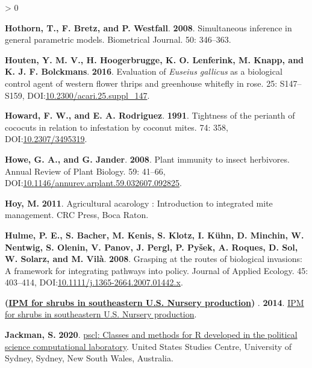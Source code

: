 \documentclass{ufdissertation}[overrideChapters] %
\newlength{\cslhangindent}
\newenvironment{CSLReferences}[2] %
 {%
  \setlength{\parindent}{0pt}
  \ifodd #1 \everypar{\setlength{\hangindent}{\cslhangindent}}\ignorespaces\fi
  \ifnum #2 > 0
  \setlength{\parskip}{#2\baselineskip}
  \fi
 }%
 {}
\begin{document}
{\begin{CSLReferences}{1}{1}
\leavevmode{}%
\textbf{Hothorn, T., F. Bretz, and P. Westfall}. \textbf{2008}. Simultaneous inference in general parametric models. Biometrical Journal. 50: 346--363.

\leavevmode{}%
\textbf{Houten, Y. M. V., H. Hoogerbrugge, K. O. Lenferink, M. Knapp, and K. J. F. Bolckmans}. \textbf{2016}. Evaluation of {\emph{Euseius gallicus}} as a biological control agent of western flower thrips and greenhouse whitefly in rose. 25: S147--S159, DOI:\href{https://doi.org/10.2300/acari.25.suppl_147}{10.2300/acari.25.suppl\_147}.

\leavevmode{}%
\textbf{Howard, F. W., and E. A. Rodriguez}. \textbf{1991}. Tightness of the perianth of cococuts in relation to infestation by coconut mites. 74: 358, DOI:\href{https://doi.org/10.2307/3495319}{10.2307/3495319}.

\leavevmode{}%
\textbf{Howe, G. A., and G. Jander}. \textbf{2008}. Plant immunity to insect herbivores. Annual Review of Plant Biology. 59: 41--66, DOI:\href{https://doi.org/10.1146/annurev.arplant.59.032607.092825}{10.1146/annurev.arplant.59.032607.092825}.

\leavevmode{}%
\textbf{Hoy, M.} \textbf{2011}. Agricultural acarology : Introduction to integrated mite management. CRC Press, Boca Raton.

\leavevmode{}%
\textbf{Hulme, P. E., S. Bacher, M. Kenis, S. Klotz, I. Kühn, D. Minchin, W. Nentwig, S. Olenin, V. Panov, J. Pergl, P. Pyšek, A. Roques, D. Sol, W. Solarz, and M. Vilà}. \textbf{2008}. Grasping at the routes of biological invasions: A framework for integrating pathways into policy. Journal of Applied Ecology. 45: 403--414, DOI:\href{https://doi.org/10.1111/j.1365-2664.2007.01442.x}{10.1111/j.1365-2664.2007.01442.x}.

\leavevmode{}%
\textbf{(\href{https://wiki.bugwood.org/IPM_Shrub_Book}{{IPM} for shrubs in southeastern {U.S.} Nursery production}) }. \textbf{2014}. \href{https://wiki.bugwood.org/IPM_Shrub_Book}{{IPM} for shrubs in southeastern {U.S.} Nursery production}.

\leavevmode{}%
\textbf{Jackman, S.} \textbf{2020}. \href{https://github.com/atahk/pscl/}{{pscl}: Classes and methods for {R} developed in the political science computational laboratory}. United States Studies Centre, University of Sydney, Sydney, New South Wales, Australia.


\end{CSLReferences}}
\end{document}
